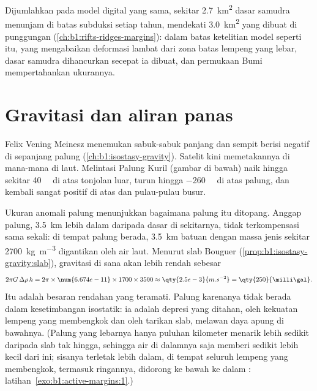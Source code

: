 Dijumlahkan pada model digital yang sama, sekitar \qty{2.7}{km^2} dasar samudra menunjam di batas subduksi setiap tahun, mendekati \qty{3.0}{km^2} yang dibuat di punggungan (\cref{ch:b1:rifts-ridges-margins}): dalam batas ketelitian model seperti itu, yang mengabaikan deformasi lambat dari zona batas lempeng yang lebar, dasar samudra dihancurkan secepat ia dibuat, dan permukaan Bumi mempertahankan ukurannya.

\section{Gravitasi dan aliran panas}\label{sec:b1:active-margins:gravity-heat}

Felix Vening Meinesz menemukan sabuk-sabuk panjang dan sempit berisi  negatif di sepanjang palung (\cref{ch:b1:isostasy-gravity}). Satelit kini memetakannya di mana-mana di laut. Melintasi Palung Kuril (gambar di bawah)  naik hingga sekitar \qty{40}{\milli\gal} di atas tonjolan luar, turun hingga \qty{-260}{\milli\gal} di atas palung, dan kembali sangat positif di atas  dan pulau-pulau busur.

Ukuran anomali palung menunjukkan bagaimana palung itu ditopang. Anggap palung, \qty{3.5}{km} lebih dalam daripada dasar di sekitarnya, tidak terkompensasi sama sekali: di tempat palung berada, \qty{3.5}{km} batuan dengan massa jenis sekitar \qty{2700}{kg.m^{-3}} digantikan oleh air laut. Menurut slab Bouguer (\cref{prop:b1:isostasy-gravity:slab}), gravitasi di sana akan lebih rendah sebesar
\[
  2\pi G\,\Delta\rho\,h = 2\pi \times \num{6.674e-11} \times 1700 \times 3500
  \approx \qty{2.5e-3}{m.s^{-2}} = \qty{250}{\milli\gal} .
\]
Itu adalah besaran rendahan yang teramati. Palung karenanya tidak berada dalam kesetimbangan isostatik: ia adalah depresi yang ditahan, oleh kekuatan lempeng yang membengkok dan oleh tarikan slab, melawan daya apung  di bawahnya. (Palung yang lebarnya hanya puluhan kilometer menarik lebih sedikit daripada slab tak hingga, sehingga air di dalamnya saja memberi sedikit lebih kecil dari ini; sisanya terletak lebih dalam, di tempat seluruh lempeng yang membengkok, termasuk  ringannya, didorong ke bawah ke dalam : latihan~\ref{exo:b1:active-margins:1}.)

